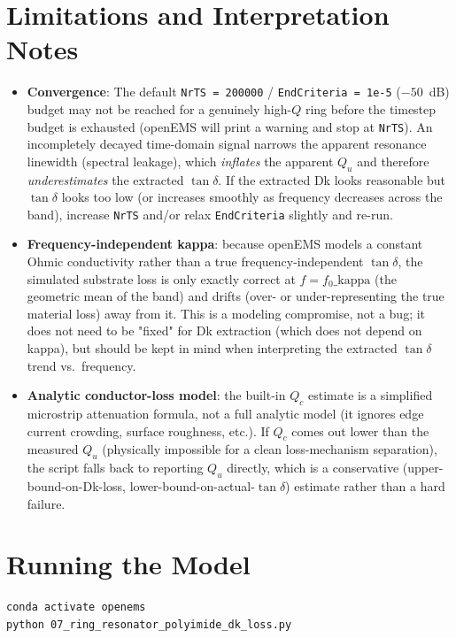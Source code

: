 \documentclass[11pt]{article}
\begin{document}
\section{Limitations and Interpretation Notes}
\label{sec:limitations}

\begin{itemize}[leftmargin=*]
\item \textbf{Convergence}: The default \texttt{NrTS = 200000} /
\texttt{EndCriteria = 1e-5} ($-50$~dB) budget may not be reached for a
genuinely high-$Q$ ring before the timestep budget is exhausted (openEMS
will print a warning and stop at \texttt{NrTS}). An incompletely decayed
time-domain signal narrows the apparent resonance linewidth (spectral
leakage), which \emph{inflates} the apparent $Q_u$ and therefore
\emph{underestimates} the extracted $\tan\delta$. If the extracted Dk looks
reasonable but $\tan\delta$ looks too low (or increases smoothly as
frequency decreases across the band), increase \texttt{NrTS} and/or relax
\texttt{EndCriteria} slightly and re-run.
\item \textbf{Frequency-independent kappa}: because openEMS models a
constant Ohmic conductivity rather than a true frequency-independent
$\tan\delta$, the simulated substrate loss is only exactly correct at
$f = f_0\_\mathrm{kappa}$ (the geometric mean of the band) and drifts
(over- or under-representing the true material loss) away from it. This is
a modeling compromise, not a bug; it does not need to be "fixed" for
Dk extraction (which does not depend on kappa), but should be kept in mind
when interpreting the extracted $\tan\delta$ trend vs.\ frequency.
\item \textbf{Analytic conductor-loss model}: the built-in $Q_c$ estimate
is a simplified microstrip attenuation formula, not a full analytic model
(it ignores edge current crowding, surface roughness, etc.). If $Q_c$ comes
out lower than the measured $Q_u$ (physically impossible for a clean
loss-mechanism separation), the script falls back to reporting $Q_u$
directly, which is a conservative (upper-bound-on-Dk-loss,
lower-bound-on-actual-$\tan\delta$) estimate rather than a hard failure.
\end{itemize}

\section{Running the Model}

\begin{lstlisting}[language=bash]
conda activate openems
python 07_ring_resonator_polyimide_dk_loss.py
\end{lstlisting}
\end{document}
